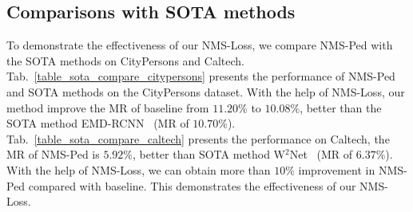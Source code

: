 \documentclass[sigconf]{acmart}
\begin{document}
\begin{table}[t]
\setlength{\abovecaptionskip}{2mm}
\setlength{\belowcaptionskip}{2mm}
\caption{\textbf{Comparisons on Caltech dataset}.}
\vspace{-1mm}
\begin{center}
\end{center}
\label{table_sota_compare_caltech}
\vspace{-2mm}
\end{table}

\subsection{Comparisons with SOTA methods}
To demonstrate the effectiveness of our NMS-Loss, we compare NMS-Ped with the SOTA methods on CityPersons and Caltech.
Tab.~\ref{table_sota_compare_citypersons} presents the performance of NMS-Ped and SOTA methods on the CityPersons dataset. With the help of NMS-Loss, our method improve the MR of baseline from $11.20\%$ to $10.08\%$, better than the SOTA method EMD-RCNN~\cite{chu2020detection} (MR of $10.70\%$). Tab.~\ref{table_sota_compare_caltech} presents the performance on Caltech, the MR of NMS-Ped is $5.92\%$, better than SOTA method W$^2$Net~\cite{luo2020whether} (MR of $6.37\%$). With the help of NMS-Loss, we can obtain more than $10\%$ improvement in NMS-Ped compared with baseline. This demonstrates the effectiveness of our NMS-Loss.
\end{document}
